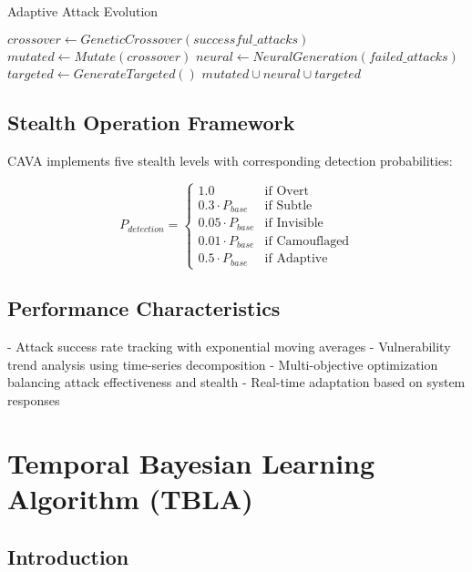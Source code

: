 \documentclass[12pt,a4paper]{article}
\begin{document}
\begin{algorithm}[H]
\caption{Adaptive Attack Evolution}
\begin{algorithmic}[1]
    \State $crossover \leftarrow GeneticCrossover(successful\_attacks)$
    \State $mutated \leftarrow Mutate(crossover)$
    \State $neural \leftarrow NeuralGeneration(failed\_attacks)$
    \State $targeted \leftarrow GenerateTargeted()$
    \State \Return $mutated \cup neural \cup targeted$
\EndFunction
\end{algorithmic}
\end{algorithm}

\subsection{Stealth Operation Framework}

CAVA implements five stealth levels with corresponding detection probabilities:

\begin{equation}
P_{detection} = \begin{cases}
1.0 & \text{if Overt} \\
0.3 \cdot P_{base} & \text{if Subtle} \\
0.05 \cdot P_{base} & \text{if Invisible} \\
0.01 \cdot P_{base} & \text{if Camouflaged} \\
0.5 \cdot P_{base} & \text{if Adaptive}
\end{cases}
\end{equation}

\subsection{Performance Characteristics}

- Attack success rate tracking with exponential moving averages
- Vulnerability trend analysis using time-series decomposition
- Multi-objective optimization balancing attack effectiveness and stealth
- Real-time adaptation based on system responses

\section{Temporal Bayesian Learning Algorithm (TBLA)}

\subsection{Introduction}
\end{document}
